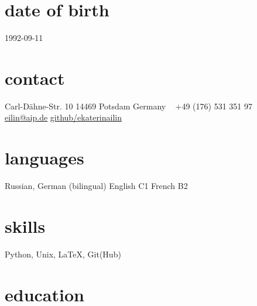 \documentclass[]{k-cv} %
\begin{document}


\begin{aside} %
\section{date of birth}
\color{gray}1992-09-11
\section{contact}
Carl-D\"ahne-Str. 10
14469 Potsdam
Germany
~
+49 (176) 531 351 97
~
\href{mailto:eilin@aip.de}{eilin@aip.de}
\href{https://github.com/ekaterinailin}{github/ekaterinailin}
\section{languages}
Russian, German (bilingual)
English C1
French B2
\section{skills}
Python, Unix, LaTeX, Git(Hub)
\end{aside}


\section{education}
\end{document}
